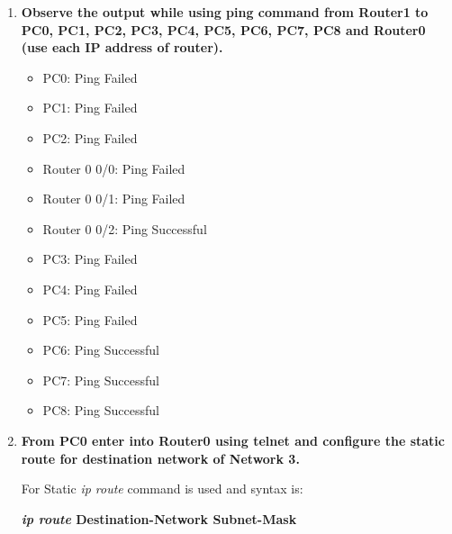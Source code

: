 \documentclass[a4paper,11pt]{article}
\begin{document}
\begin{enumerate}
      \item \textbf{Observe the output while using ping command from Router1 to PC0, PC1, PC2, PC3, PC4, PC5, PC6, PC7, PC8 and Router0 (use each IP address of router).}
            \begin{itemize}
                  \item PC0: Ping Failed
                  \item PC1: Ping Failed
                  \item PC2: Ping Failed
                  \item Router 0 0/0: Ping Failed
                  \item Router 0 0/1: Ping Failed
                  \item Router 0 0/2: Ping Successful
                  \item PC3: Ping Failed
                  \item PC4: Ping Failed
                  \item PC5: Ping Failed
                  \item PC6: Ping Successful
                  \item PC7: Ping Successful
                  \item PC8: Ping Successful
            \end{itemize}

      \item \textbf{From PC0 enter into Router0 using telnet and configure the static route for destination network of  Network 3.}

            For Static \textit{ip route} command is used and syntax is:
            \begin{center}
                  {\bfseries \textit {ip route}  \quad Destination-Network \quad  Subnet-Mask   }
            \end{center}


\end{enumerate}
\end{document}

